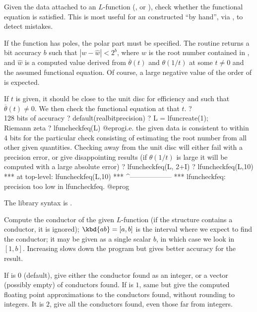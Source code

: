 \label{se:lfuncheckfeq}
Given the data attached to an $L$-function (, 
or ), check whether the functional equation is satisfied.
This is most useful for an  constructed ``by hand'', via
, to detect mistakes.

If the function has poles, the polar part must be specified. The routine
returns a bit accuracy $b$ such that $|w - \hat{w}| < 2^{b}$, where $w$ is
the root number contained in , and $\hat{w}$ is a computed value
derived from $\overline{\theta}(t)$ and $\theta(1/t)$ at some $t\neq 0$ and
the assumed functional equation. Of course, a large negative value of the
order of  is expected.

If $t$ is given, it should be close to the unit disc for efficiency and
such that $\overline{\theta}(t) \neq 0$. We then check the functional
equation at that $t$.
\bprog
?        \\ 128 bits of accuracy
? default(realbitprecision)
? L = lfuncreate(1);  \\ Riemann zeta
? lfuncheckfeq(L)
@eprog\noindent i.e. the given data is consistent to within 4 bits for the
particular check consisting of estimating the root number from all other
given quantities. Checking away from the unit disc will either fail with
a precision error, or give disappointing results (if $\theta(1/t)$ is
large it will be computed with a large absolute error)
\bprog
? lfuncheckfeq(L, 2+I)
? lfuncheckfeq(L,10)
 ***   at top-level: lfuncheckfeq(L,10)
 ***                 ^------------------
 *** lfuncheckfeq: precision too low in lfuncheckfeq.
@eprog

The library syntax is .

\label{se:lfunconductor}
Compute the conductor of the given $L$-function
 (if the structure contains a conductor, it is ignored);
 $\kbd{ab} = [a,b]$ is the interval where we expect to find the conductor;
 it may be given as a single scalar $b$, in which case we look in $[1,b]$.
 Increasing  slows down the program but gives better accuracy for the
 result.

 If  is $0$ (default), give either the conductor found as an
 integer, or a vector (possibly empty) of conductors found. If  is
 $1$, same but give the computed floating point approximations to the
 conductors found, without rounding to integers. It  is $2$, give
 all the conductors found, even those far from integers.

